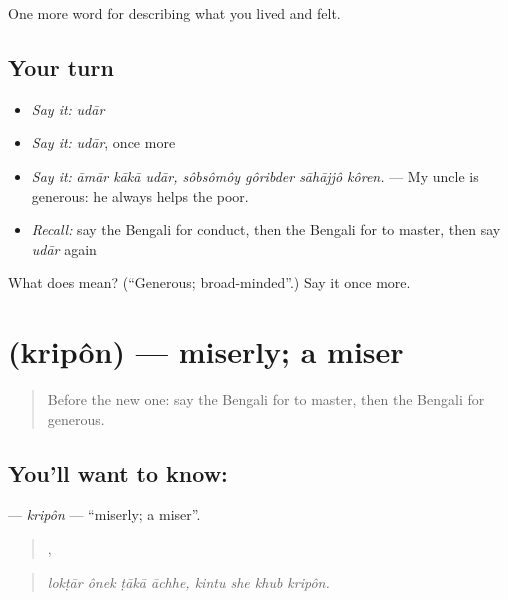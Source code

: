 \begin{grammarlens}[title={What you've built}]
One more word for describing what you lived and felt.
\end{grammarlens}

\subsection*{Your turn}
\begin{itemize}
\raggedright
  \item \emph{Say it:} \emph{udār}
  \item \emph{Say it:} \emph{udār}, once more
  \item \emph{Say it:} \emph{āmār kākā udār, sôbsômôy gôribder sāhājjô kôren.} — My uncle is generous: he always helps the poor.
  \item \emph{Recall:} say the Bengali for conduct, then the Bengali for to master, then say \emph{udār} again
\end{itemize}

\begin{tcolorbox}[breakable,colback=teal!4,colframe=teal!35!black,title={Before you move on}]
What does  mean? (\textquotedblleft{}Generous; broad-minded\textquotedblright{}.) Say it once more.
\end{tcolorbox}
\section[\texorpdfstring{\bn{কৃপণ} (kripôn)}{কৃপণ (kripôn)}]{ (kripôn) — miserly; a miser}

\label{lesson:BN-C457-kripon}



\begin{quote}
Before the new one: say the Bengali for to master, then the Bengali for generous.
\end{quote}

\subsection*{You'll want to know: }
\textbf{} — \emph{kripôn} — \textquotedblleft{}miserly; a miser\textquotedblright{}.

\begin{quote}
   ,    
\end{quote}

\begin{quote}
\emph{lokṭār ônek ṭākā āchhe, kintu she khub kripôn.}
\end{quote}

